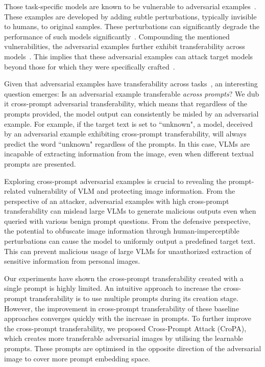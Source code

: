 Those task-specific models are known to be vulnerable to adversarial examples~\citep{goodfellow2014explaining,szegedy2013intriguing,wu2022towards,gu2022segpgd}. These examples are developed by adding subtle perturbations, typically invisible to humans, to original samples. These perturbations can significantly degrade the performance of such models significantly~\citep{madry2017towards}. Compounding the mentioned vulnerabilities, the adversarial examples further exhibit transferability across models~\citep{gu2023survey}. This implies that these adversarial examples can attack target models beyond those for which they were specifically crafted~\citep{liu2016delving,tramer2017space}.

Given that adversarial examples have transferability across tasks~\citep{salzmann2021learning_transferable_nips,gu2023survey}, an interesting question emerges: Is an adversarial example transferable \textit{across prompts}? We dub it cross-prompt adversarial transferability, which means that regardless of the prompts provided, the model output can consistently be misled by an adversarial example. For example, if the target text is set to ``unknown", a model, deceived by an adversarial example exhibiting cross-prompt transferability, will always predict the word ``unknown" regardless of the prompts. In this case, VLMs are incapable of extracting information from the image, even when different textual prompts are presented.

Exploring cross-prompt adversarial examples is crucial to revealing the prompt-related vulnerability of VLM and protecting image information. From the perspective of an attacker, adversarial examples with high cross-prompt transferability can mislead large VLMs to generate malicious outputs even when queried with various benign prompt questions. From the defensive perspective, the potential to obfuscate image information through human-imperceptible perturbations can cause the model to uniformly output a predefined target text. This can prevent malicious usage of large VLMs for unauthorized extraction of sensitive information from personal images.

Our experiments have shown the cross-prompt transferability created with a single prompt is highly limited. An intuitive approach to increase the cross-prompt transferability is to use multiple prompts during its creation stage. However, the improvement in cross-prompt transferability of these baseline approaches converges quickly with the increase in prompts. To further improve the cross-prompt transferability, we proposed Cross-Prompt Attack (CroPA), which creates more transferable adversarial images by utilising the learnable prompts. These prompts are optimised in the opposite direction of the adversarial image to cover more prompt embedding space.

